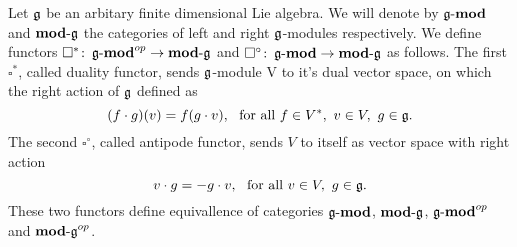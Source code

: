 % 
Let $\mathfrak{g}$ be an arbitary finite dimensional Lie algebra. We will denote by $\operatorname{\mathbf{\mathfrak{g}-mod}}$ and
$\operatorname{\mathbf{mod-\mathfrak{g}}}$ the categories of left and right $\mathfrak{g}$-modules respectively. We define functors 
$\square^*\colon \operatorname{\mathbf{\mathfrak{g}-mod}}^{op} \to \operatorname{\mathbf{mod-\mathfrak{g}}}$ and $\square^\circ\colon \operatorname{\mathbf{\mathfrak{g}-mod}} \to
\operatorname{\mathbf{mod-\mathfrak{g}}}$ as follows. The first $\square^*$, called duality functor, sends $\mathfrak{g}$-module V to
it's dual vector space, on which the right action of $\mathfrak{g}$ defined as 
\[
    (f\cdot g) (v) = f(g\cdot v),~\text{ for all } f\in V^*,~v \in V,~g\in\mathfrak{g}.
\]
The second $\square^\circ$, called antipode functor, sends $V$ to itself as vector space with right
action
\[
    v\cdot g = - g\cdot v,~\text{ for all } v \in V,~g\in\mathfrak{g}.
\]
These two functors define equivallence of categories $\operatorname{\mathbf{\mathfrak{g}-mod}}$, $\operatorname{\mathbf{mod-\mathfrak{g}}}$, $\operatorname{\mathbf{\mathfrak{g}-mod}}^{op}$
and $\operatorname{\mathbf{mod-\mathfrak{g}}}^{op}$.  
